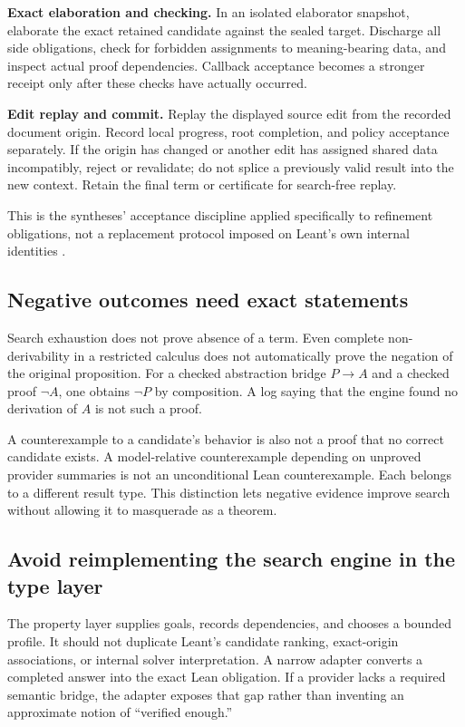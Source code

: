 \documentclass[11pt,letterpaper]{article}
\theoremstyle{definition}
\theoremstyle{remark}
\begin{document}
\textbf{Exact elaboration and checking.} In an isolated elaborator snapshot,
elaborate the exact retained candidate against the sealed target. Discharge all
side obligations, check for forbidden assignments to meaning-bearing data, and
inspect actual proof dependencies. Callback acceptance becomes a stronger
receipt only after these checks have actually occurred.

\textbf{Edit replay and commit.} Replay the displayed source edit from the
recorded document origin. Record local progress, root completion, and policy
acceptance separately. If the origin has changed or another edit has assigned
shared data incompatibly, reject or revalidate; do not splice a previously
valid result into the new context. Retain the final term or certificate for
search-free replay.

This is the syntheses' acceptance discipline applied specifically to refinement
obligations, not a replacement protocol imposed on Leant's own internal
identities \cite{syn-a,syn-b,leant-internals}.

\subsection{Negative outcomes need exact statements}
Search exhaustion does not prove absence of a term. Even complete
non-derivability in a restricted calculus does not automatically prove the
negation of the original proposition. For a checked abstraction bridge
$P\to A$ and a checked proof $\neg A$, one obtains $\neg P$ by composition.
A log saying that the engine found no derivation of $A$ is not such a proof.

A counterexample to a candidate's behavior is also not a proof that no correct
candidate exists. A model-relative counterexample depending on unproved
provider summaries is not an unconditional Lean counterexample. Each belongs
to a different result type. This distinction lets negative evidence improve
search without allowing it to masquerade as a theorem.

\subsection{Avoid reimplementing the search engine in the type layer}
The property layer supplies goals, records dependencies, and chooses a bounded
profile. It should not duplicate Leant's candidate ranking, exact-origin
associations, or internal solver interpretation. A narrow adapter converts a
completed answer into the exact Lean obligation. If a provider lacks a required
semantic bridge, the adapter exposes that gap rather than inventing an
approximate notion of ``verified enough.''
\end{document}
